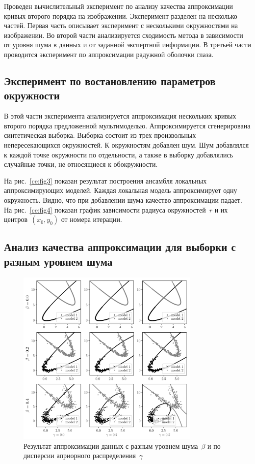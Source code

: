 \documentclass[12pt]{a&t}
\begin{document}
Проведен вычислительный эксперимент по анализу качества аппроксимации кривых второго порядка на изображении. Эксперимент разделен на несколько частей. Первая часть описывает эксперимент с несколькими окружностями на изображении. Во второй части анализируется сходимость метода в зависимости от уровня шума в данных и от заданной экспертной информации. В третьей части проводится эксперимент по аппроксимации радужной оболочки глаза.

\subsection{Эксперимент по востановлению параметров окружности}

В этой части эксперимента анализируется аппроксимация нескольких кривых второго порядка предложенной мультимоделью. Аппроксимируется сгенерирована синтетическая выборка. Выборка состоит из трех произвольных непересекающихся окружностей. К окружностям добавлен шум. Шум добавлялся к каждой точке окружности по отдельности, а также в выборку добавлялись случайные точки, не относящиеся к обокружности.

На рис.~\ref{ce:fig3} показан результат построения ансамбля локальных аппроксимирующих моделей. Каждая локальная модель аппроксимирует одну окружность. Видно, что при добавлении шума качество аппроксимации падает.
На рис.~\ref{ce:fig4} показан график зависимости радиуса окружностей~$r$ и их центров~$(x_0, y_0)$ от номера итерации.

\subsection{Анализ качества аппроксимации для выборки с разным уровнем шума}
\begin{figure}[h!t]
\begin{center}
    \includegraphics[width=0.8\textwidth]{beta_gamma}
\end{center}
\caption{Результат аппроксимации данных с разным уровнем шума~$\beta$ и по дисперсии априорного распределения~$\gamma$}
\label{ce:fig6}
\end{figure}
\end{document}
